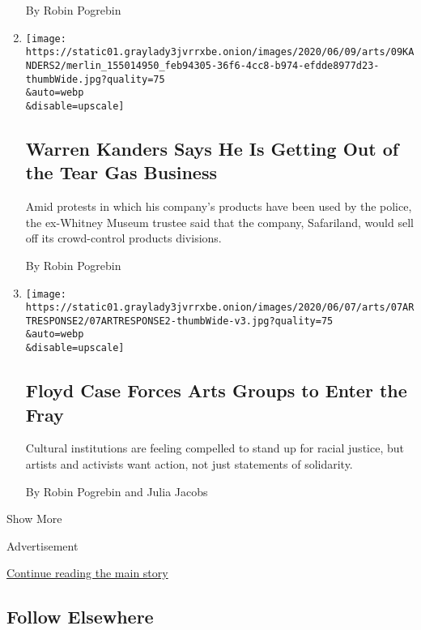 \begin{enumerate}
  By Robin Pogrebin
\item
  \href{/2020/06/09/arts/design/tear-gas-warren-kanders.html}{}

  \texttt{[image: https://static01.graylady3jvrrxbe.onion/images/2020/06/09/arts/09KANDERS2/merlin\_155014950\_feb94305-36f6-4cc8-b974-efdde8977d23-thumbWide.jpg?quality=75\\\&auto=webp\\\&disable=upscale]}

  \hypertarget{warren-kanders-says-he-is-getting-out-of-the-tear-gas-business}{%
  \subsection{Warren Kanders Says He Is Getting Out of the Tear Gas
  Business}\label{warren-kanders-says-he-is-getting-out-of-the-tear-gas-business}}

  Amid protests in which his company's products have been used by the
  police, the ex-Whitney Museum trustee said that the company,
  Safariland, would sell off its crowd-control products divisions.

  By Robin Pogrebin
\item
  \href{/2020/06/07/arts/museums-theaters-protests.html}{}

  \texttt{[image: https://static01.graylady3jvrrxbe.onion/images/2020/06/07/arts/07ARTRESPONSE2/07ARTRESPONSE2-thumbWide-v3.jpg?quality=75\\\&auto=webp\\\&disable=upscale]}

  \hypertarget{floyd-case-forces-arts-groups-to-enter-the-fray}{%
  \subsection{Floyd Case Forces Arts Groups to Enter the
  Fray}\label{floyd-case-forces-arts-groups-to-enter-the-fray}}

  Cultural institutions are feeling compelled to stand up for racial
  justice, but artists and activists want action, not just statements of
  solidarity.

  By Robin Pogrebin and Julia Jacobs
\end{enumerate}

Show More

Advertisement

\protect\hyperlink{after-mid2}{Continue reading the main story}

\hypertarget{follow-elsewhere}{%
\subsection{Follow Elsewhere}\label{follow-elsewhere}}

